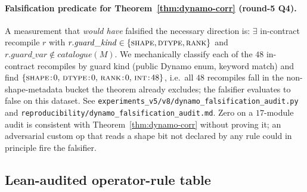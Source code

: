 \paragraph{Falsification predicate for Theorem~\ref{thm:dynamo-corr}
(round-5 Q4).}
A measurement that \emph{would have} falsified the necessary
direction is: $\exists$ in-contract recompile $r$ with
$r.\mathit{guard\_kind}\in\{\textsc{shape},\textsc{dtype},\textsc{rank}\}$
and $r.\mathit{guard\_var}\notin\mathit{catalogue}(M)$.  We mechanically
classify each of the $48$ in-contract recompiles by guard kind
(public Dynamo enum, keyword match) and find
$\{\textsc{shape}\!:\!0,\,\textsc{dtype}\!:\!0,\,\textsc{rank}\!:\!0,\,
\textsc{int}\!:\!48\}$, i.e.\ all $48$ recompiles fall in the
non-shape-metadata bucket the theorem already excludes; the
falsifier evaluates to false on this dataset.  See
\texttt{experiments\_v5/v8/dynamo\_falsification\_audit.py} and
\texttt{reproducibility/dynamo\_falsification\_audit.md}.  Zero on a
$17$-module audit is consistent with Theorem~\ref{thm:dynamo-corr}
without proving it; an adversarial custom op that reads a shape bit
not declared by any rule could in principle fire the falsifier.

\subsection{Lean-audited operator-rule table}
\label{sec:eval-lean}

